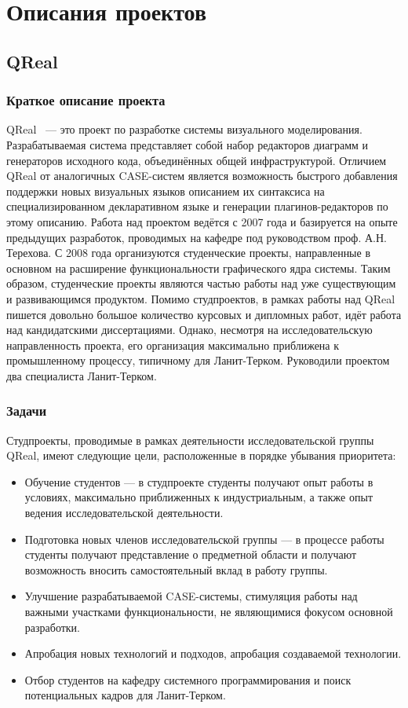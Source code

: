 \documentclass[a5paper]{article}
\begin{document}
\section{Описания проектов}
\subsection{QReal}
\subsubsection{Краткое описание проекта}
QReal~\cite{qreal} --- это проект по разработке системы визуального моделирования. Разрабатываемая система представляет собой набор редакторов диаграмм и генераторов исходного кода, объединённых общей инфраструктурой. Отличием QReal от аналогичных CASE-систем является возможность быстрого добавления поддержки новых визуальных языков описанием их синтаксиса на специализированном декларативном языке и генерации плагинов-редакторов по этому описанию. Работа над проектом ведётся с 2007 года и базируется на опыте предыдущих разработок, проводимых на кафедре под руководством проф. А.Н. Терехова. С 2008 года организуются студенческие проекты, направленные в основном на расширение функциональности графического ядра системы. Таким образом, студенческие проекты являются частью работы над уже существующим и развивающимся продуктом. Помимо студпроектов, в рамках работы над QReal пишется довольно большое количество курсовых и дипломных работ, идёт работа над кандидатскими диссертациями. Однако, несмотря на исследовательскую направленность проекта, его организация максимально приближена к промышленному процессу, типичному для Ланит-Терком. Руководили проектом два специалиста Ланит-Терком.

\subsubsection{Задачи}
Студпроекты, проводимые в рамках деятельности исследовательской группы QReal, имеют следующие цели, расположенные в порядке убывания приоритета:
\begin{itemize}
	\item Обучение студентов --- в студпроекте студенты получают опыт работы в условиях, максимально приближенных к индустриальным, а также опыт ведения исследовательской деятельности.
	\item Подготовка новых членов исследовательской группы --- в процессе работы студенты получают представление о предметной области и получают возможность вносить самостоятельный вклад в работу группы.
	\item Улучшение разрабатываемой CASE-системы, стимуляция работы над важными участками функциональности, не являющимися фокусом основной разработки.
	\item Апробация новых технологий и подходов, апробация создаваемой технологии.
	\item Отбор студентов на кафедру системного программирования и поиск потенциальных кадров для Ланит-Терком.
\end{itemize}
\end{document}

